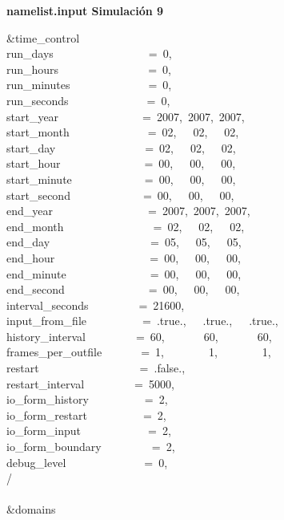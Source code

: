 
\textbf{namelist.input Simulación 9}

\&time\_control~~~~~~~~~~~~\\
run\_days~~~~~~~~~~~~~~~~~=~0,\\
run\_hours~~~~~~~~~~~~~~~~=~0,\\
run\_minutes~~~~~~~~~~~~~~=~0,\\
run\_seconds~~~~~~~~~~~~~~=~0,\\
start\_year~~~~~~~~~~~~~~~=~2007,~2007,~2007,\\
start\_month~~~~~~~~~~~~~~=~02,~~~02,~~~02,~~\\
start\_day~~~~~~~~~~~~~~~~=~02,~~~02,~~~02,~~\\
start\_hour~~~~~~~~~~~~~~~=~00,~~~00,~~~00,~~\\
start\_minute~~~~~~~~~~~~~=~00,~~~00,~~~00,~~\\
start\_second~~~~~~~~~~~~~=~00,~~~00,~~~00,~~\\
end\_year~~~~~~~~~~~~~~~~~=~2007,~2007,~2007,\\
end\_month~~~~~~~~~~~~~~~~=~02,~~~02,~~~02,~~\\
end\_day~~~~~~~~~~~~~~~~~~=~05,~~~05,~~~05,~~\\
end\_hour~~~~~~~~~~~~~~~~~=~00,~~~00,~~~00,~~\\
end\_minute~~~~~~~~~~~~~~~=~00,~~~00,~~~00,~~\\
end\_second~~~~~~~~~~~~~~~=~00,~~~00,~~~00,~~\\
interval\_seconds~~~~~~~~~=~21600,\\
input\_from\_file~~~~~~~~~~=~.true.,~~~.true.,~~~.true.,\\
history\_interval~~~~~~~~~=~60,~~~~~~~60,~~~~~~~60,\\
frames\_per\_outfile~~~~~~~=~1,~~~~~~~~1,~~~~~~~~1,\\
restart~~~~~~~~~~~~~~~~~~=~.false.,\\
restart\_interval~~~~~~~~~=~5000,\\
io\_form\_history~~~~~~~~~~=~2,\\
io\_form\_restart~~~~~~~~~~=~2,\\
io\_form\_input~~~~~~~~~~~~=~2,\\
io\_form\_boundary~~~~~~~~~=~2,\\
debug\_level~~~~~~~~~~~~~~=~0,\\
/\\
\\
\&domains~~~~~~~~~~~~~~~~~\\
